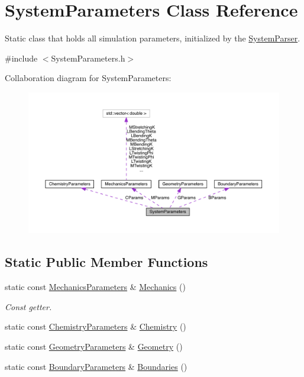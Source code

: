 \hypertarget{classSystemParameters}{\section{System\+Parameters Class Reference}
\label{classSystemParameters}
}


Static class that holds all simulation parameters, initialized by the \hyperlink{classSystemParser}{System\+Parser}.  




{\ttfamily \#include $<$System\+Parameters.\+h$>$}



Collaboration diagram for System\+Parameters\+:\nopagebreak
\begin{figure}[H]
\begin{center}
\leavevmode
\includegraphics[width=350pt]{classSystemParameters__coll__graph}
\end{center}
\end{figure}
\subsection*{Static Public Member Functions}
{\bf }\par
\begin{DoxyCompactItemize}
\item 
static const \hyperlink{structMechanicsParameters}{Mechanics\+Parameters} \& \hyperlink{classSystemParameters_a8099e2ebea135ea5d7c7e79d34600f52}{Mechanics} ()
\begin{DoxyCompactList}\small\item\em Const getter. \end{DoxyCompactList}\item 
static const \hyperlink{structChemistryParameters}{Chemistry\+Parameters} \& \hyperlink{classSystemParameters_a05c9527eb94d2cf4f164de3ef09afc4b}{Chemistry} ()
\item 
static const \hyperlink{structGeometryParameters}{Geometry\+Parameters} \& \hyperlink{classSystemParameters_a9211bca7e3422c076f4e9ba2dc29c599}{Geometry} ()
\item 
static const \hyperlink{structBoundaryParameters}{Boundary\+Parameters} \& \hyperlink{classSystemParameters_a6e73fd102a3699c854d9e503c1b75fc1}{Boundaries} ()
\end{DoxyCompactItemize}

